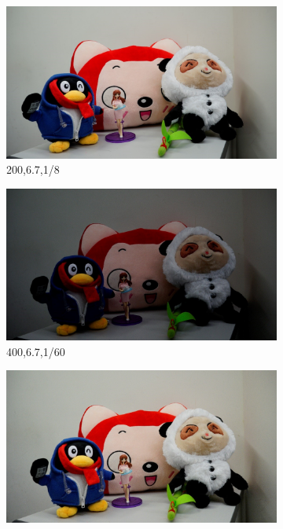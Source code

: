 \begin{figure}
    \hfill
    \begin{subfigure}[t]{0.32\textwidth}
        \centering
        \includegraphics[width=1\textwidth]{images/dataset/200_6-7_1-8.jpg}
		\caption{200,6.7,1/8}
    \end{subfigure}
    \hfill
    \begin{subfigure}[t]{0.32\textwidth}
        \centering
        \includegraphics[width=1\textwidth]{images/dataset/400_6-7_1-60.jpg}
		\caption{400,6.7,1/60}
    \end{subfigure}
    \hfill
    \begin{subfigure}[t]{0.32\textwidth}
        \centering
        \includegraphics[width=1\textwidth]{images/dataset/1600_6-7_1-60.jpg}

\end{subfigure}
\end{figure}
